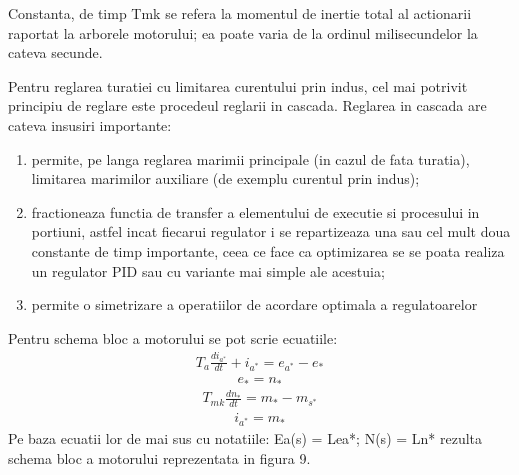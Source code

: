 \documentclass[11pt]{article}
\begin{document}
Constanta, de timp Tmk se refera la momentul de inertie total al actionarii raportat la arborele motorului; ea poate varia de la ordinul milisecundelor la cateva secunde. 

Pentru reglarea turatiei cu limitarea curentului prin indus, cel mai potrivit principiu de reglare este procedeul reglarii in cascada. Reglarea in cascada are cateva insusiri importante: 
\begin{enumerate}[label=$\bullet$]
	\item permite, pe langa reglarea marimii principale (in cazul de fata turatia), limitarea marimilor auxiliare (de exemplu curentul prin indus); 
	\item fractioneaza functia de transfer a elementului de executie si procesului in portiuni, astfel incat fiecarui regulator i se repartizeaza una sau cel mult doua constante de timp importante, ceea ce face ca optimizarea se se poata realiza un regulator PID sau cu variante mai simple ale acestuia; 
	\item permite o simetrizare a operatiilor de acordare optimala a regulatoarelor 
\end{enumerate}
Pentru schema bloc a motorului se pot scrie ecuatiile:
\begin{align}
T_a\frac{di_{a^*}}{dt}+i_{a^*}=e_{a^*}-e_*
\end{align}
\begin{align}
e_*=n_*
\end{align}
\begin{align}
T_{mk}\frac{dn_{*}}{dt}=m_{*}-m_{s^*}
\end{align}
\begin{align}
i_{a^*}=m_*
\end{align}
Pe baza ecuatii lor de mai sus cu notatiile: Ea(s) = L{ea*}; N(s) = L{n*} rezulta schema bloc a motorului reprezentata in figura 9.
\newpage

\nocite{*}


\end{document}
